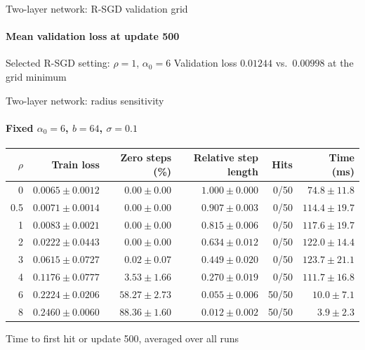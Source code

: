 \documentclass[aspectratio=169,xcolor=table]{beamer}
\begin{document}
\begin{frame}{Two-layer network: R-SGD validation grid}
    \framesubtitle{Mean validation loss at update 500}
    \centering
    \renewcommand{\arraystretch}{1.08}
    \setlength{\tabcolsep}{4pt}
    
    \vspace{0.4em}

    \begin{block}{Selected R-SGD setting: \(\rho=1\), \(\alpha_0=6\)}
        Validation loss \(0.01244\) vs.\ \(0.00998\) at the grid minimum
    \end{block}
\end{frame}

\begin{frame}{Two-layer network: radius sensitivity}
    \framesubtitle{Fixed \(\alpha_0=6\), \(b=64\), \(\sigma=0.1\)}
    \centering
    \small
    \renewcommand{\arraystretch}{1.10}
    \begin{tabular}{rrrrrr}
        \toprule
        \(\rho\) & Train loss & Zero steps (\%) & Relative step length & Hits & Time (ms) \\
        \midrule
        0   & \(0.0065\pm0.0012\) & \(0.00\pm0.00\) & \(1.000\pm0.000\) & 0/50  & \(74.8\pm11.8\) \\
        0.5 & \(0.0071\pm0.0014\) & \(0.00\pm0.00\) & \(0.907\pm0.003\) & 0/50  & \(114.4\pm19.7\) \\
        1   & \(0.0083\pm0.0021\) & \(0.00\pm0.00\) & \(0.815\pm0.006\) & 0/50  & \(117.6\pm19.7\) \\
        2   & \(0.0222\pm0.0443\) & \(0.00\pm0.00\) & \(0.634\pm0.012\) & 0/50  & \(122.0\pm14.4\) \\
        3   & \(0.0615\pm0.0727\) & \(0.02\pm0.07\) & \(0.449\pm0.020\) & 0/50  & \(123.7\pm21.1\) \\
        4   & \(0.1176\pm0.0777\) & \(3.53\pm1.66\) & \(0.270\pm0.019\) & 0/50  & \(111.7\pm16.8\) \\
        6   & \(0.2224\pm0.0206\) & \(58.27\pm2.73\) & \(0.055\pm0.006\) & 50/50 & \(10.0\pm7.1\) \\
        8   & \(0.2460\pm0.0060\) & \(88.36\pm1.60\) & \(0.012\pm0.002\) & 50/50 & \(3.9\pm2.3\) \\
        \bottomrule
    \end{tabular}

    \medskip
    Time to first hit or update 500, averaged over all runs
\end{frame}
\end{document}
